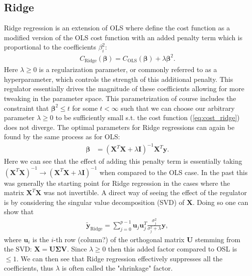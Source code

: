 \documentclass[%
reprint,
amsmath,amssymb,
aps,
pra,
]{revtex4-2}
\begin{document}
\subsection{Ridge}	\label{sec:THEORY_Ridge}
Ridge regression is an extension of OLS where define the cost function as a modified version of the OLS cost function with an added penalty term which is proportional to the coefficients $\beta_i^2$:
\begin{align}
	C_\text{Ridge}(\bm\beta)=C_\text{OLS}(\bm\beta)+\lambda\bm\beta^2.
	\label{eq:cost_ridge}
\end{align}
Here $\lambda\geq0$ is a regularization parameter, or commonly referred to as a hyperparameter, which controls the strength of this additional penalty. This regulator essentially drives the magnitude of these coefficients allowing for more tweaking in the parameter space. This parametrization of course includes the constraint that $\bm{\beta}^2\leq t$ for some $t<\infty$ such that we can choose our arbitrary parameter $\lambda\geq0$ to be sufficiently small s.t. the cost function (\ref{eq:cost_ridge}) does not diverge. The optimal parameters for Ridge regressions can again be found by the same process as for OLS:
\begin{align*}
	\bm{\beta}&=(\bm{X}^T\bm{X}+\lambda\bm{I})^{-1}\bm{X}^T\bm{y}.
\end{align*}
Here we can see that the effect of adding this penalty term is essentially taking $(\bm X^T\bm X)^{-1}\to(\bm X^T\bm X+\lambda\bm I)^{-1}$ when compared to the OLS case. In the past this was generally the starting point for Ridge regression in the cases where the matrix $\bm X^T\bm X$ was not invertible. A direct way of seeing the effect of the regulator is by considering the singular value decomposition (SVD) of $\bm X$. Doing so one can show that 
\begin{align}
	\tilde{\bm{y}}_\text{Ridge}=\sum_{j=0}^{p-1}\bm{u}_j\bm{u}_j^T\frac{\sigma_j^2}{\sigma_j^2+\lambda}\bm{y},
	\label{eq:beta_ridge}
\end{align}
where $\bm u_i$ is the $i$-th row (column?) of the orthogonal matrix $\bm U$ stemming from the SVD: $\bm X=\bm U\bm \Sigma\bm V$. Since $\lambda\geq0$ then this added factor compared to OSL is $\leq1$. We can then see that Ridge regression effectively suppresses all the coefficients, thus $\lambda$ is often called the "shrinkage" factor. 
\end{document}
